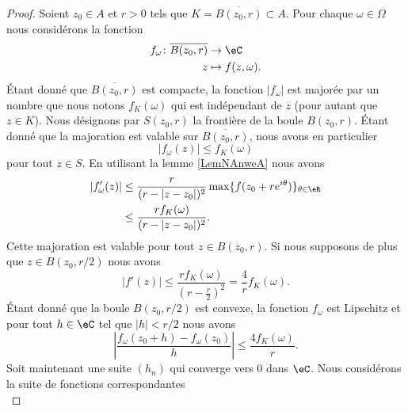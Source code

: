 \begin{proof}
    Soient \( z_0\in A\) et \( r>0\) tels que \( K=\overline{ B(z_0,r) }\subset A\). Pour chaque \( \omega\in \Omega\) nous considérons la fonction
    \begin{equation}
        \begin{aligned}
            f_{\omega}\colon \overline{ B(z_0,r) }&\to \eC \\
            z&\mapsto f(z,\omega). 
        \end{aligned}
    \end{equation}
    Étant donné que \( \overline{ B(z_0,r) }\) est compacte, la fonction \( | f_{\omega} |\) est majorée par un nombre que nous notons \( f_K(\omega)\) qui est indépendant de \( z\) (pour autant que $z\in K$). Nous désignons par \( S(z_0,r)\) la frontière de la boule \( B(z_0,r)\). Étant donné que la majoration est valable sur \( \overline{ B(z_0,r) }\), nous avons en particulier
    \begin{equation}
        | f_{\omega}(z) |\leq f_K(\omega)
    \end{equation}
    pour tout \( z\in S\). En utilisant la lemme \ref{LemNAnweA} nous avons
    \begin{subequations}
        \begin{align}
            | f'_{\omega}(z) |&\leq \frac{ r }{ (r-| z-z_0 |)^2 }\max\{ f(z_0+r e^{i\theta}) \}_{\theta\in \eR}\\
            &\leq \frac{ rf_K(\omega) }{ (r-| z-z_0 |)^2 }.
        \end{align}
    \end{subequations}
    Cette majoration est valable pour tout \( z\in B(z_0,r)\). Si nous supposons de plus que \( z\in B(z_0,r/2)\)  nous avons
    \begin{equation}
        | f'(z) |\leq \frac{ rf_K(\omega) }{ \left( r-\frac{ r }{2} \right)^2 }=\frac{ 4 }{ r }f_K(\omega).
    \end{equation}
    Étant donné que la boule \( B(z_0,r/2)\) est convexe, la fonction \( f_{\omega}\) est Lipschitz et pour tout \( h\in \eC\) tel que \( | h |<r/2\) nous avons
    \begin{equation}
        \left| \frac{ f_{\omega}(z_0+h)-f_{\omega}(z_0) }{ h } \right| \leq \frac{ 4f_K(\omega) }{ r }.
    \end{equation}
    Soit maintenant une suite \( (h_n)\) qui converge vers \( 0\) dans \( \eC\). Nous considérons la suite de fonctions correspondantes
    \begin{equation}

\end{equation}
\end{proof}

